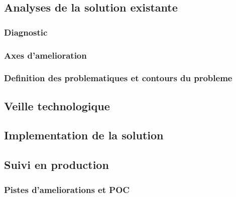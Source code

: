     \subsection{Analyses de la solution existante}
        \subsubsection{Diagnostic}
        \subsubsection{Axes d'amelioration}
        \subsubsection{Definition des problematiques et contours du probleme}
    \subsection{Veille technologique}
    \subsection{Implementation de la solution}
    \subsection{Suivi en production}
    \subsubsection{Pistes d'ameliorations et POC}        
